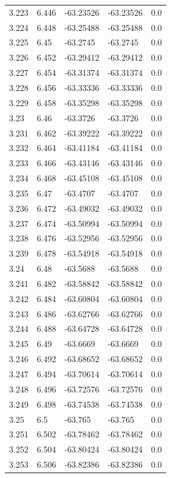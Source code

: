 \begin{tabular}{lllll}
3.223 & 6.446 & -63.23526 & -63.23526 & 0.0 \\
3.224 & 6.448 & -63.25488 & -63.25488 & 0.0 \\
3.225 & 6.45 & -63.2745 & -63.2745 & 0.0 \\
3.226 & 6.452 & -63.29412 & -63.29412 & 0.0 \\
3.227 & 6.454 & -63.31374 & -63.31374 & 0.0 \\
3.228 & 6.456 & -63.33336 & -63.33336 & 0.0 \\
3.229 & 6.458 & -63.35298 & -63.35298 & 0.0 \\
3.23 & 6.46 & -63.3726 & -63.3726 & 0.0 \\
3.231 & 6.462 & -63.39222 & -63.39222 & 0.0 \\
3.232 & 6.464 & -63.41184 & -63.41184 & 0.0 \\
3.233 & 6.466 & -63.43146 & -63.43146 & 0.0 \\
3.234 & 6.468 & -63.45108 & -63.45108 & 0.0 \\
3.235 & 6.47 & -63.4707 & -63.4707 & 0.0 \\
3.236 & 6.472 & -63.49032 & -63.49032 & 0.0 \\
3.237 & 6.474 & -63.50994 & -63.50994 & 0.0 \\
3.238 & 6.476 & -63.52956 & -63.52956 & 0.0 \\
3.239 & 6.478 & -63.54918 & -63.54918 & 0.0 \\
3.24 & 6.48 & -63.5688 & -63.5688 & 0.0 \\
3.241 & 6.482 & -63.58842 & -63.58842 & 0.0 \\
3.242 & 6.484 & -63.60804 & -63.60804 & 0.0 \\
3.243 & 6.486 & -63.62766 & -63.62766 & 0.0 \\
3.244 & 6.488 & -63.64728 & -63.64728 & 0.0 \\
3.245 & 6.49 & -63.6669 & -63.6669 & 0.0 \\
3.246 & 6.492 & -63.68652 & -63.68652 & 0.0 \\
3.247 & 6.494 & -63.70614 & -63.70614 & 0.0 \\
3.248 & 6.496 & -63.72576 & -63.72576 & 0.0 \\
3.249 & 6.498 & -63.74538 & -63.74538 & 0.0 \\
3.25 & 6.5 & -63.765 & -63.765 & 0.0 \\
3.251 & 6.502 & -63.78462 & -63.78462 & 0.0 \\
3.252 & 6.504 & -63.80424 & -63.80424 & 0.0 \\
3.253 & 6.506 & -63.82386 & -63.82386 & 0.0 \\

\end{tabular}
